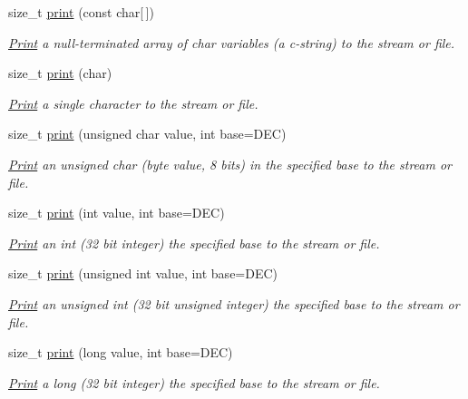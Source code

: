 \begin{DoxyCompactItemize}
size\+\_\+t \mbox{\hyperlink{class_print_acfe80773011eb17dfb52c2fba517a093}{print}} (const char\mbox{[}$\,$\mbox{]})
\begin{DoxyCompactList}\small\item\em \mbox{\hyperlink{class_print}{Print}} a null-\/terminated array of char variables (a c-\/string) to the stream or file. \end{DoxyCompactList}\item 
\mbox{\label{class_print_a1e411d07a8ffec5faf7ce485bac0f029}} 
size\+\_\+t \mbox{\hyperlink{class_print_a1e411d07a8ffec5faf7ce485bac0f029}{print}} (char)
\begin{DoxyCompactList}\small\item\em \mbox{\hyperlink{class_print}{Print}} a single character to the stream or file. \end{DoxyCompactList}\item 
size\+\_\+t \mbox{\hyperlink{class_print_ae35481e77567618140cd58d8b96d3747}{print}} (unsigned char value, int base=D\+EC)
\begin{DoxyCompactList}\small\item\em \mbox{\hyperlink{class_print}{Print}} an unsigned char (byte value, 8 bits) in the specified base to the stream or file. \end{DoxyCompactList}\item 
size\+\_\+t \mbox{\hyperlink{class_print_aa28ddbde83b14df73b41c919ecc4478f}{print}} (int value, int base=D\+EC)
\begin{DoxyCompactList}\small\item\em \mbox{\hyperlink{class_print}{Print}} an int (32 bit integer) the specified base to the stream or file. \end{DoxyCompactList}\item 
size\+\_\+t \mbox{\hyperlink{class_print_afcd7d3a184df961a502643e4fb638c52}{print}} (unsigned int value, int base=D\+EC)
\begin{DoxyCompactList}\small\item\em \mbox{\hyperlink{class_print}{Print}} an unsigned int (32 bit unsigned integer) the specified base to the stream or file. \end{DoxyCompactList}\item 
size\+\_\+t \mbox{\hyperlink{class_print_a0c663ac015ebc037ea044ba2e2cf2947}{print}} (long value, int base=D\+EC)
\begin{DoxyCompactList}\small\item\em \mbox{\hyperlink{class_print}{Print}} a long (32 bit integer) the specified base to the stream or file. \end{DoxyCompactList}\item 

\end{DoxyCompactItemize}
